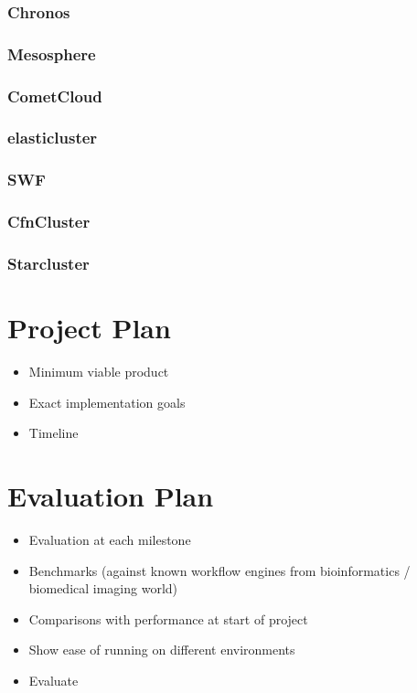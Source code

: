 \documentclass[11pt,a4paper]{report}
\begin{document}
\subsection{Chronos}

\subsection{Mesosphere}

\subsection{CometCloud}

\subsection{elasticluster}

\subsection{SWF}

\subsection{CfnCluster}

\subsection{Starcluster}

\chapter{Project Plan}
\begin{itemize}
	\item Minimum viable product
	\item Exact implementation goals
	\item Timeline
\end{itemize}

\chapter{Evaluation Plan}
\begin{itemize}
	\item Evaluation at each milestone
	\item Benchmarks (against known workflow engines from bioinformatics / biomedical imaging world)
	\item Comparisons with performance at start of project
	\item Show ease of running on different environments
	\item Evaluate
\end{itemize}

\listoftodos


\end{document}
